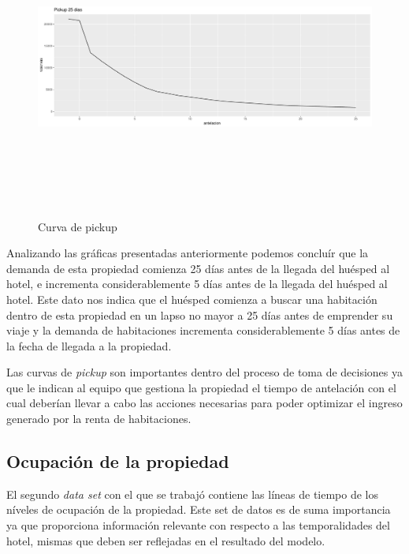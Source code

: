 \begin{figure}[H]
  \centering
      \includegraphics[width=\maxwidth,height=10cm]{figures/pickupzoom-1}  
  \caption{Curva de pickup}
\end{figure}

Analizando las gráficas presentadas anteriormente podemos concluír que la demanda de esta propiedad comienza 25 días antes de la llegada del huésped al hotel, e incrementa considerablemente 5 días antes de la llegada del huésped al hotel. Este dato nos indica que el huésped comienza a buscar una habitación dentro de esta propiedad en un lapso no mayor a 25 días antes de emprender su viaje y la demanda de habitaciones incrementa considerablemente 5 días antes de la fecha de llegada a la propiedad.

Las curvas de \emph{pickup} son importantes dentro del proceso de toma de decisiones ya que le indican al equipo que gestiona la propiedad el tiempo de antelación con el cual deberían llevar a cabo las acciones necesarias para poder optimizar el ingreso generado por la renta de habitaciones.

\subsection*{Ocupación de la propiedad}

El segundo \emph{data set} con el que se trabajó contiene las líneas de tiempo de los níveles de ocupación de la propiedad. Este set de datos es de suma importancia ya que proporciona información relevante con respecto a las temporalidades del hotel, mismas que deben ser reflejadas en el resultado del modelo.

